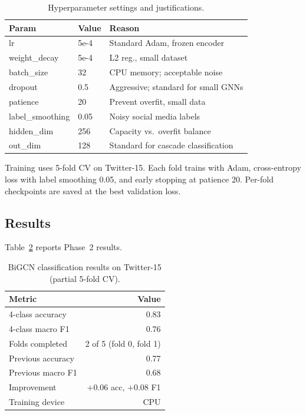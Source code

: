 \documentclass[conference]{IEEEtran}
\begin{document}
\begin{table}[h]
\caption{Hyperparameter settings and justifications.}
\label{tab:hyperparams}
\centering
\small
\begin{tabular}{lll}
\toprule
\textbf{Param} & \textbf{Value} & \textbf{Reason} \\
\midrule
lr              & 5e-4 & Standard Adam, frozen encoder \\
weight\_decay   & 5e-4 & L2 reg., small dataset \\
batch\_size     & 32   & CPU memory; acceptable noise \\
dropout         & 0.5  & Aggressive; standard for small GNNs \\
patience        & 20   & Prevent overfit, small data \\
label\_smoothing& 0.05 & Noisy social media labels \\
hidden\_dim     & 256  & Capacity vs.\ overfit balance \\
out\_dim        & 128  & Standard for cascade classification \\
\bottomrule
\end{tabular}
\end{table}

Training uses 5-fold CV on Twitter-15.
Each fold trains with Adam, cross-entropy loss with label smoothing 0.05, and
early stopping at patience 20.
Per-fold checkpoints are saved at the best validation loss.

\subsection{Results}

Table~\ref{tab:bigcn_results} reports Phase~2 results.

\begin{table}[h]
\caption{BiGCN classification results on Twitter-15 (partial 5-fold CV).}
\label{tab:bigcn_results}
\centering
\small
\begin{tabular}{lr}
\toprule
\textbf{Metric} & \textbf{Value} \\
\midrule
4-class accuracy    & 0.83 \\
4-class macro F1    & 0.76 \\
Folds completed     & 2 of 5 (fold 0, fold 1) \\
Previous accuracy   & 0.77 \\
Previous macro F1   & 0.68 \\
Improvement         & $+0.06$ acc, $+0.08$ F1 \\
Training device     & CPU \\
\bottomrule
\end{tabular}
\end{table}
\end{document}
